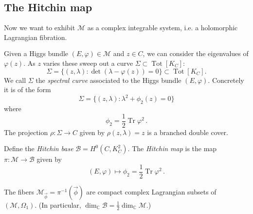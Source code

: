 \documentclass[12pt,letterpaper,reqno]{article}
\numberwithin{equation}{section}
\newcommand{\cB}{\ensuremath{\mathcal B}}
\newcommand{\cM}{\ensuremath{\mathcal M}}
\newcommand{\bbC}{\ensuremath{\mathbb C}}
\newcommand{\half}{\ensuremath{\frac{1}{2}}}
\newcommand{\vphi}{{\vec\phi}}
\newcommand{\ti}[1]{\textit{#1}}
\DeclareMathOperator{\Tr}{Tr}
\DeclareMathOperator{\Jac}{Jac}
\DeclareMathOperator{\Tot}{Tot}
\newcommand{\SU}{\mathrm{SU}}
\newcommand{\U}{\mathrm{U}}
\begin{document}




\subsection{The Hitchin map}

Now we want to exhibit $\cM$ as a complex integrable system,
i.e. a holomorphic Lagrangian fibration.

Given a Higgs bundle $(E,\varphi) \in \cM$ and $z \in C$,
we can consider the eigenvalues of $\varphi(z)$. As $z$ varies
these sweep out a curve $\Sigma \subset \Tot[K_C]$:
\begin{equation}
  \Sigma = \{ (z,\lambda): \det(\lambda - \varphi(z)) = 0\} \subset \Tot[K_C].
\end{equation}
We call $\Sigma$
the \ti{spectral curve} associated to the Higgs 
bundle $(E,\varphi)$.
Concretely it is of the form
\begin{equation}
  \Sigma = \{ (z,\lambda): \lambda^2 + \phi_2(z) = 0\}
\end{equation}
where
\begin{equation}
  \phi_2 = \frac12 \Tr \varphi^2 \, .
\end{equation}
The projection $\rho: \Sigma \to C$ given by $\rho(z,\lambda) = z$ 
is a branched double cover.

\begin{defn}
Define the \ti{Hitchin base} $\cB = H^0(C, K_C^2)$.
The \ti{Hitchin map} is the map $\pi: \cM \to \cB$ given by
\begin{equation}
  (E, \varphi) \mapsto \phi_2 = \frac12 \Tr \varphi^2 \, .
\end{equation}
\end{defn}

\begin{prop} The fibers
$\cM_\vphi = \pi^{-1}(\vphi)$ 
are compact complex Lagrangian subsets of $(\cM, \Omega_1)$. (In particular, $\dim_\bbC \cB = \half \dim_\bbC \cM$.)
\end{prop}
\end{document}

